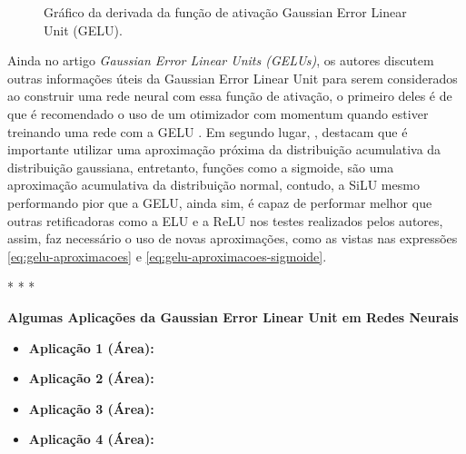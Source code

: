 \begin{figure}[htbp]
    \centering
    \caption{Gráfico da derivada da função de ativação Gaussian Error Linear Unit (GELU).}
    \label{fig:gelu-derivada}
\end{figure}

Ainda no artigo \textit{Gaussian Error Linear Units (GELUs)}, os autores discutem outras informações úteis da Gaussian Error Linear Unit para serem considerados ao construir uma rede neural com essa função de ativação, o primeiro deles é de que é recomendado o uso de um otimizador com momentum quando estiver treinando uma rede com a GELU \parencite{GELUArticle}. Em segundo lugar, \textcite{GELUArticle}, destacam que é importante utilizar uma aproximação próxima da distribuição acumulativa da distribuição gaussiana, entretanto, funções como a sigmoide, são uma aproximação acumulativa da distribuição normal, contudo, a SiLU mesmo performando pior que a GELU, ainda sim, é capaz de performar melhor que outras retificadoras como a ELU e a ReLU nos testes realizados pelos autores, assim, faz necessário o uso de novas aproximações, como as vistas nas expressões \ref{eq:gelu-aproximacoes} e \ref{eq:gelu-aproximacoes-sigmoide}.

\medskip
\begin{center}
 * * *
\end{center}
\medskip

\textbf{Algumas Aplicações da Gaussian Error Linear Unit em Redes Neurais}
\vspace{1em} 

\begin{itemize}
    \item \textbf{Aplicação 1 (Área):}
    \item \textbf{Aplicação 2 (Área):}
    \item \textbf{Aplicação 3 (Área):}
    \item \textbf{Aplicação 4 (Área):}
\end{itemize}

